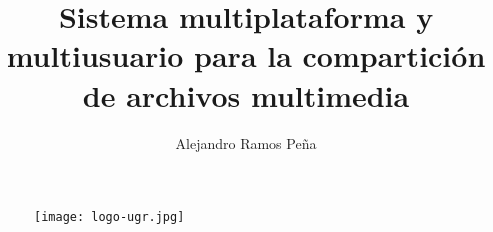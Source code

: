 \documentclass[16pt]{article}
\title{Sistema multiplataforma y multiusuario para la compartición de
archivos multimedia}
\author{Alejandro Ramos Peña}
\begin{document}
\begin{titlingpage}
  \maketitle
  \begin{figure}[!h]
    \centering
    \texttt{[image: logo-ugr.jpg]}
  \end{figure}
\end{titlingpage}



\tableofcontents
\newpage
















\end{document}
